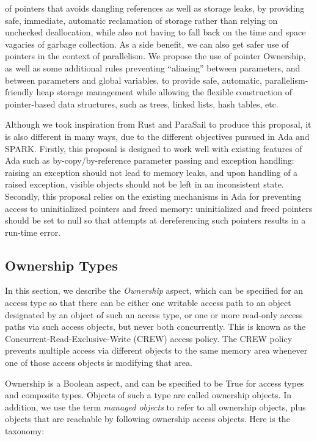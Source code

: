\documentclass{llncs}
\begin{document}
of pointers that avoids dangling references as well as storage leaks, by providing safe, immediate, automatic reclamation of storage rather than relying on unchecked deallocation,
while also not having to fall back on the time and space vagaries of garbage collection.  As a side benefit, we can also get safer use of pointers in the context of parallelism.
We propose the use of pointer Ownership, as well as some additional rules preventing ``aliasing'' between parameters, and between parameters and global variables, to provide safe,
automatic, parallelism-friendly heap storage management while allowing the flexible construction of pointer-based data structures, such as trees, linked lists, hash tables, etc.

\smallskip
Although we took inspiration from Rust and ParaSail to produce this proposal, it is also different in many ways, due to the different objectives pursued in Ada and SPARK. Firstly,
this proposal is designed to work well with existing features of Ada such as by-copy/by-reference parameter passing and exception handling: raising an exception should not lead to
memory leaks, and upon handling of a raised exception, visible objects should not be left in an inconsistent state. Secondly, this proposal relies on the existing mechanisms in Ada
for preventing access to uninitialized pointers and freed memory: uninitialized and freed pointers should be set to null so that attempts at dereferencing such pointers results in a run-time error.




\subsection{Ownership Types}
\label{sec:ownership}

In this section, we describe the \textit{Ownership} aspect, which can be specified for an access type so that there can be either one writable access path to an object
designated by an object of such an access type, or one or more read-only access paths via such access objects, but never both concurrently. This is known as
the Concurrent-Read-Exclusive-Write (CREW) access policy. The CREW policy prevents multiple access via different objects to the same memory area whenever one
of those access objects is modifying that area.

\smallskip
Ownership is a Boolean aspect, and can be specified to be True for access types and composite types.  Objects of such a type are called ownership objects.
In addition, we use the term \textit{managed objects} to refer to all ownership objects, plus objects that are reachable by following ownership access objects.
Here is the taxonomy:
\end{document}
